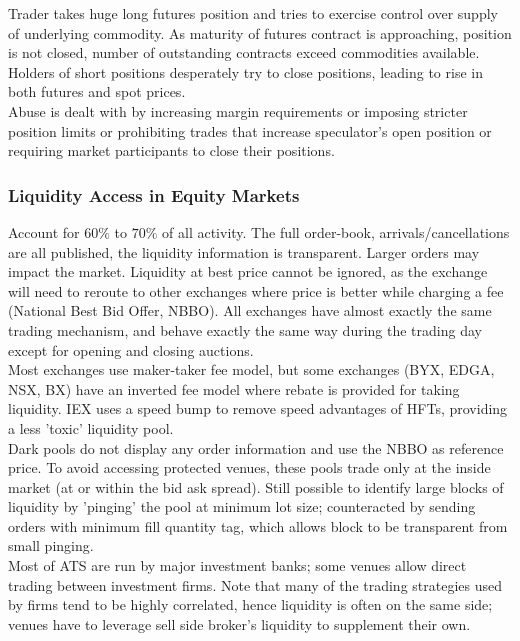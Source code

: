 \begin{remark}
 Trader takes huge long futures position and tries to exercise control over supply of underlying commodity. As maturity of futures contract is approaching, position is not closed, number of outstanding contracts exceed commodities available. Holders of short positions desperately try to close positions, leading to rise in both futures and spot prices.\\
Abuse is dealt with by increasing margin requirements or imposing stricter position limits or prohibiting trades that increase speculator's open position or requiring market participants to close their positions.
\end{remark}

\subsubsection{Liquidity Access in Equity Markets}

 Account for $60\%$ to $70\%$ of all activity. The full order-book, arrivals/cancellations are all published, the liquidity information is transparent. Larger orders may impact the market. Liquidity at best price cannot be ignored, as the exchange will need to reroute to other exchanges where price is better while charging a fee (National Best Bid Offer, NBBO). All exchanges have almost exactly the same trading mechanism, and behave exactly the same way during the trading day except for opening and closing auctions.\\
Most exchanges use maker-taker fee model, but some exchanges (BYX, EDGA, NSX, BX) have an inverted fee model where rebate is provided for taking liquidity. IEX uses a speed bump to remove speed advantages of HFTs, providing a less 'toxic' liquidity pool.\\

 Dark pools do not display any order information and use the NBBO as reference price. To avoid accessing protected venues, these pools trade only at the inside market (at or within the bid ask spread). Still possible to identify large blocks of liquidity by 'pinging' the pool at minimum lot size; counteracted by sending orders with minimum fill quantity tag, which allows block to be transparent from small pinging.\\
Most of ATS are run by major investment banks; some venues allow direct trading between investment firms. Note that many of the trading strategies used by firms tend to be highly correlated, hence liquidity is often on the same side; venues have to leverage sell side broker's liquidity to supplement their own.\\

